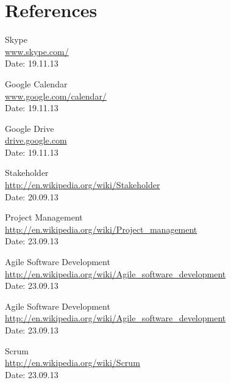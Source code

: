 \chapter{References}

\begingroup
\renewcommand{\chapter}[2]{} %
\begin{thebibliography}{99}


	Skype \\
	\href{http://www.skype.com/en/}{www.skype.com/} \\
	Date: 19.11.13

	Google Calendar \\
	\href {https://www.google.com/calendar/}{www.google.com/calendar/} \\
	Date: 19.11.13

	Google Drive \\
	\href {https://drive.google.com}{drive.google.com} \\
	Date: 19.11.13

	Stakeholder \\
	\href{http://en.wikipedia.org/wiki/Stakeholder}{http://en.wikipedia.org/wiki/Stakeholder} \\
	Date: 20.09.13

	Project Management \\
	\href{http://en.wikipedia.org/wiki/Project_management}{http://en.wikipedia.org/wiki/Project\_management} \\
	Date: 23.09.13

	Agile Software Development \\
	\href{http://en.wikipedia.org/wiki/Agile_software_development}{http://en.wikipedia.org/wiki/Agile\_software\_development} \\
	Date: 23.09.13

	Agile Software Development \\
	\href {http://en.wikipedia.org/wiki/Agile_software_development}{http://en.wikipedia.org/wiki/Agile\_software\_development} \\
	Date: 23.09.13

	Scrum \\ 
	\href{http://en.wikipedia.org/wiki/Scrum}{http://en.wikipedia.org/wiki/Scrum} \\
	Date: 23.09.13


\end{thebibliography}
